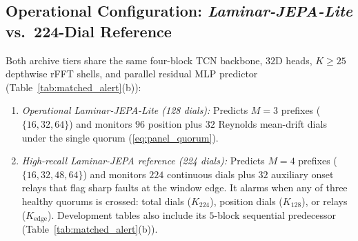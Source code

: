 \documentclass[journal]{IEEEtran}
\begin{document}
\subsection{Operational Configuration: \emph{Laminar-JEPA-Lite} vs.\ 224-Dial Reference}
\label{subsec:laminar_lite}
Both archive tiers share the same four-block TCN backbone, $32$D heads, $K \ge 25$ depthwise rFFT shells, and parallel residual MLP predictor (Table~\ref{tab:matched_alert}(b)):
\begin{enumerate}[leftmargin=*,nosep,itemsep=1pt]
    \item \emph{Operational \emph{Laminar-JEPA-Lite} (128 dials):} Predicts $M=3$ prefixes ($\{16, 32, 64\}$) and monitors $96$ position plus $32$ Reynolds mean-drift dials under the single quorum (\ref{eq:panel_quorum}).
    \item \emph{High-recall \emph{Laminar-JEPA} reference (224 dials):} Predicts $M=4$ prefixes ($\{16, 32, 48, 64\}$) and monitors $224$ continuous dials plus $32$ auxiliary onset relays that flag sharp faults at the window edge. It alarms when any of three healthy quorums is crossed: total dials ($K_{224}$), position dials ($K_{128}$), or relays ($K_{\text{edge}}$). Development tables also include its $5$-block sequential predecessor (Table~\ref{tab:matched_alert}(b)).
\end{enumerate}
\end{document}
